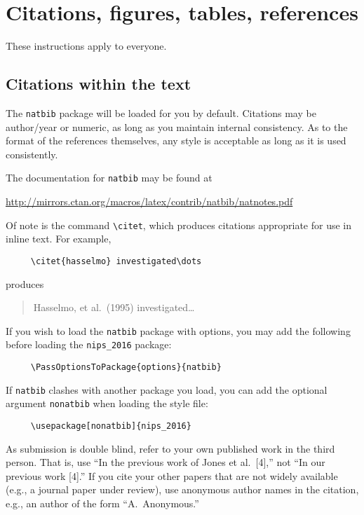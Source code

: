 \documentclass{article}
\begin{document}
  \section{Citations, figures, tables, references}
  \label{others}
  
  These instructions apply to everyone.
  
  \subsection{Citations within the text}
  
  The \verb+natbib+ package will be loaded for you by default.
  Citations may be author/year or numeric, as long as you maintain
  internal consistency.  As to the format of the references themselves,
  any style is acceptable as long as it is used consistently.
  
  The documentation for \verb+natbib+ may be found at
  \begin{center}
    \url{http://mirrors.ctan.org/macros/latex/contrib/natbib/natnotes.pdf}
  \end{center}
  Of note is the command \verb+\citet+, which produces citations
  appropriate for use in inline text.  For example,
  \begin{verbatim}
     \citet{hasselmo} investigated\dots
  \end{verbatim}
  produces
  \begin{quote}
    Hasselmo, et al.\ (1995) investigated\dots
  \end{quote}
  
  If you wish to load the \verb+natbib+ package with options, you may
  add the following before loading the \verb+nips_2016+ package:
  \begin{verbatim}
     \PassOptionsToPackage{options}{natbib}
  \end{verbatim}
  
  If \verb+natbib+ clashes with another package you load, you can add
  the optional argument \verb+nonatbib+ when loading the style file:
  \begin{verbatim}
     \usepackage[nonatbib]{nips_2016}
  \end{verbatim}
  
  As submission is double blind, refer to your own published work in the
  third person. That is, use ``In the previous work of Jones et
  al.\ [4],'' not ``In our previous work [4].'' If you cite your other
  papers that are not widely available (e.g., a journal paper under
  review), use anonymous author names in the citation, e.g., an author
  of the form ``A.\ Anonymous.''
  
\end{document}
